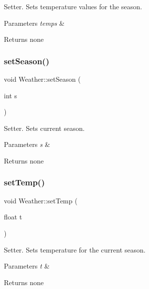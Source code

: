 Setter. Sets temperature values for the season. 
\begin{DoxyParams}{Parameters}
{\em temps} & \\
\hline
\end{DoxyParams}
\begin{DoxyReturn}{Returns}
none 
\end{DoxyReturn}
\mbox{\label{class_weather_af5d55c02bf46aef483a52454ad13d9d7}} 
\subsubsection{\texorpdfstring{set\+Season()}{setSeason()}}
{\footnotesize\ttfamily void Weather\+::set\+Season (\begin{DoxyParamCaption}\item[{int}]{s }\end{DoxyParamCaption})}

Setter. Sets current season. 
\begin{DoxyParams}{Parameters}
{\em s} & \\
\hline
\end{DoxyParams}
\begin{DoxyReturn}{Returns}
none 
\end{DoxyReturn}
\mbox{\label{class_weather_a18a24d73cc6fa3bf83c5e5033109b321}} 
\subsubsection{\texorpdfstring{set\+Temp()}{setTemp()}}
{\footnotesize\ttfamily void Weather\+::set\+Temp (\begin{DoxyParamCaption}\item[{float}]{t }\end{DoxyParamCaption})}

Setter. Sets temperature for the current season. 
\begin{DoxyParams}{Parameters}
{\em t} & \\
\hline
\end{DoxyParams}
\begin{DoxyReturn}{Returns}
none 
\end{DoxyReturn}
\mbox{\label{class_weather_a6d4f87a1b1f5e07099b1d315385f3f5b}} 
